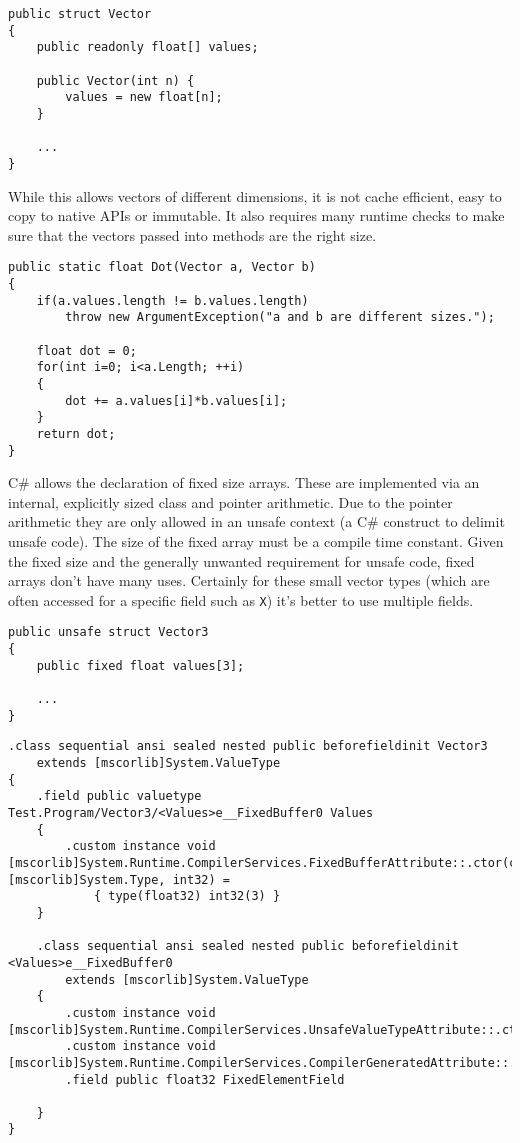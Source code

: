 \begin{lstlisting}[caption={Vector using CLI array}, keywordstyle={\color{blue}},language=sharpc]
public struct Vector
{
	public readonly float[] values;
	
	public Vector(int n) {
		values = new float[n];
	}
	
	...
}
\end{lstlisting}

While this allows vectors of different dimensions, it is not cache efficient, easy to copy to native APIs or immutable.
It also requires many runtime checks to make sure that the vectors passed into methods are the right size.

\begin{lstlisting}[caption={Runtime checks needed when using arrays}, keywordstyle={\color{blue}},language=sharpc]
public static float Dot(Vector a, Vector b)
{
	if(a.values.length != b.values.length)
		throw new ArgumentException("a and b are different sizes.");
		
	float dot = 0;
	for(int i=0; i<a.Length; ++i)
	{
		dot += a.values[i]*b.values[i];
	}
	return dot;
}
\end{lstlisting}

C\# allows the declaration of fixed size arrays. These are implemented via an internal, explicitly sized class and pointer
arithmetic. Due to the pointer arithmetic they are only allowed in an unsafe context (a C\# construct to delimit unsafe code).
The size of the fixed array must be a compile time constant. Given the fixed size and the generally unwanted requirement for
unsafe code, fixed arrays don't have many uses. Certainly for these small vector types (which are often accessed for a specific 
field such as \texttt{X}) it's better to use multiple fields.

\begin{lstlisting}[caption={A fixed size vector type}, keywordstyle={\color{blue}},language=sharpc]
public unsafe struct Vector3
{
	public fixed float values[3]; 
	
	...
}
\end{lstlisting}

\begin{lstlisting}[caption={Translation to CIL}, keywordstyle={\color{blue}},language=cil]
.class sequential ansi sealed nested public beforefieldinit Vector3
    extends [mscorlib]System.ValueType
{
    .field public valuetype Test.Program/Vector3/<Values>e__FixedBuffer0 Values
    {
        .custom instance void [mscorlib]System.Runtime.CompilerServices.FixedBufferAttribute::.ctor(class [mscorlib]System.Type, int32) = 
			{ type(float32) int32(3) }
    }

    .class sequential ansi sealed nested public beforefieldinit <Values>e__FixedBuffer0
        extends [mscorlib]System.ValueType
    {
        .custom instance void [mscorlib]System.Runtime.CompilerServices.UnsafeValueTypeAttribute::.ctor()
        .custom instance void [mscorlib]System.Runtime.CompilerServices.CompilerGeneratedAttribute::.ctor()
        .field public float32 FixedElementField

    }
}
\end{lstlisting}


